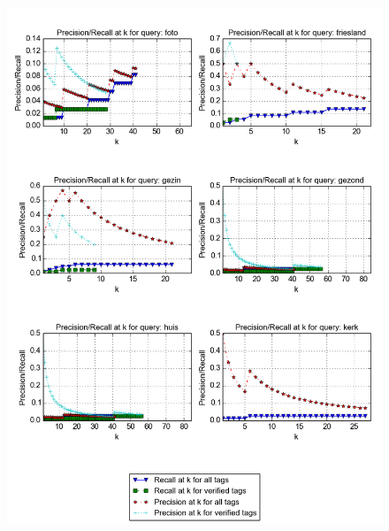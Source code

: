 \begin{figure}[H]
\centering
\includegraphics[width=\textwidth]{appendixd/queries-foto}
\end{figure}


